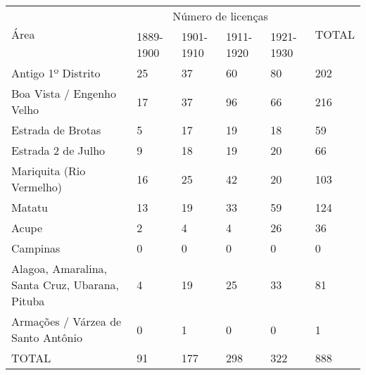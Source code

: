 \begin{table}[!htp]
{
\begin{tiny}
\begin{tabular}{llllll}
\toprule
\multirow{2}{*}{Área}	& \multicolumn{4}{c}{Número de licenças}	& \multirow{2}{*}{TOTAL}\\
\cline{2-5}
	&1889-1900	&1901-1910	&1911-1920	&1921-1930	& \\
\midrule
\midrule
Antigo 1º Distrito	&25	&37	&60	&80	&202\\
Boa Vista / Engenho Velho	&17	&37	&96	&66	&216\\
Estrada de Brotas	&5	&17	&19	&18	&59\\
Estrada 2 de Julho	&9	&18	&19	&20	&66\\
Mariquita (Rio Vermelho)	&16	&25	&42	&20	&103\\
Matatu	&13	&19	&33	&59	&124\\
Acupe	&2	&4	&4	&26	&36\\
Campinas	&0	&0	&0	&0	&0\\
Alagoa, Amaralina, Santa Cruz, Ubarana, Pituba	&4	&19	&25	&33	&81\\
Armações / Várzea de Santo Antônio	&0	&1	&0	&0	&1\\
\midrule
TOTAL	&91	&177	&298	&322	&888\\
\bottomrule
\end{tabular} 
\end{tiny}
}
{}
\end{table}
